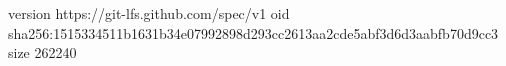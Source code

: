 version https://git-lfs.github.com/spec/v1
oid sha256:1515334511b1631b34e07992898d293cc2613aa2cde5abf3d6d3aabfb70d9cc3
size 262240
